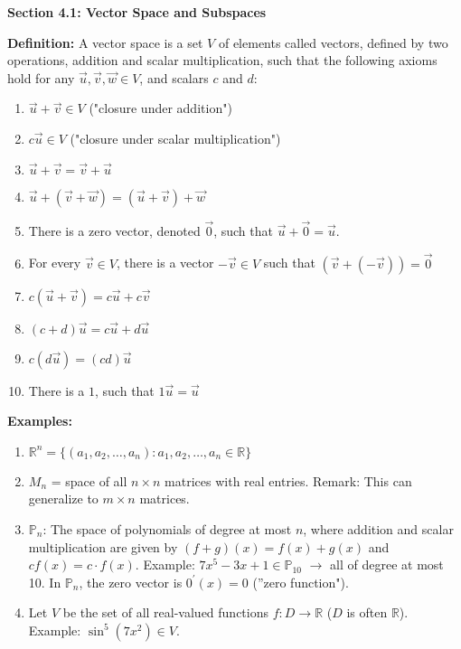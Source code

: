 \documentclass{article}
\begin{document}
\textbf{Section 4.1: Vector Space and Subspaces}

\textbf{Definition:} A vector space is a set \( V \) of elements called vectors, defined by two operations, addition and scalar multiplication, such that the following axioms hold for any \( \vec{u}, \vec{v}, \vec{w} \in V \), and scalars \( c \) and \( d \):

\begin{enumerate}
    \item \( \vec{u} + \vec{v} \in V \) ("closure under addition")
    \item \( c\vec{u} \in V \) ("closure under scalar multiplication")
    \item \( \vec{u} + \vec{v} = \vec{v} + \vec{u} \)
    \item \( \vec{u} + (\vec{v} + \vec{w}) = (\vec{u} + \vec{v}) + \vec{w} \)
    \item There is a zero vector, denoted \( \vec{0} \), such that \( \vec{u} + \vec{0} = \vec{u} \).
    \item For every \( \vec{v} \in V \), there is a vector \( -\vec{v} \in V \) such that \( (\vec{v} + (-\vec{v})) = \vec{0} \)
    \item \( c(\vec{u} + \vec{v}) = c\vec{u} + c\vec{v} \)
    \item \( (c + d)\vec{u} = c\vec{u} + d\vec{u} \)
    \item \( c(d\vec{u}) = (cd)\vec{u} \)
    \item There is a \( 1 \), such that \( 1\vec{u} = \vec{u} \)
\end{enumerate}


\textbf{Examples:}
\begin{enumerate}
    \item \( \mathbb{R}^n = \{ (a_1, a_2, \ldots, a_n) : a_1, a_2, \ldots, a_n \in \mathbb{R} \} \)
    \item \( M_n \) = space of all \( n \times n \) matrices with real entries. Remark: This can generalize to \( m \times n \) matrices.
    \item \( \mathbb{P}_n \): The space of polynomials of degree at most \( n \), where addition and scalar multiplication are given by \( (f+g)(x) = f(x) + g(x) \) and \( cf(x) = c \cdot f(x) \). Example: \( 7x^5 - 3x + 1 \in \mathbb{P}_{10} \) $\rightarrow$ all of degree at most 10. In \( \mathbb{P}_n \), the zero vector is \( 0^{\prime}(x) = 0 \) (''zero function").
    \item Let \( V \) be the set of all real-valued functions \( f: D \to \mathbb{R} \) (\( D \) is often \( \mathbb{R} \)). Example: \( \sin^5(7x^2) \in V \).
\end{enumerate}
\end{document}
